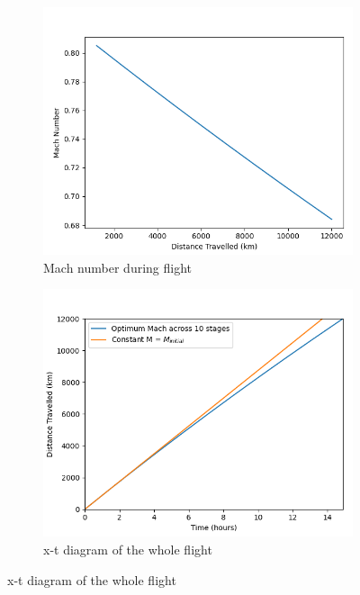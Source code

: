 \documentclass[12pt, a4paper]{article}
\begin{document}
\renewcommand{\thesubfigure}{\thefigure\alph{subfigure}}
\renewcommand{\subfigurename}{Figure}
\captionsetup[figure]{belowskip=-1.5cm}
\begin{figure}[H]
	
	\begin{subfigure}[b]{0.5\textwidth}
		\centering
		\includegraphics[width=\textwidth]{../Plots/mach 9.5 45}
		\caption{Mach number during flight}
		\label{fig:mach}
	\end{subfigure}
	\hfill
	\begin{subfigure}[b]{0.5\textwidth}
		\centering
		\includegraphics[width=\textwidth]{../Plots/xt diagram 9.5 45}
		\caption{x-t diagram of the whole flight}
		\label{fig:xt}
	\end{subfigure}
	\hfill
\end{figure}
\end{document}
